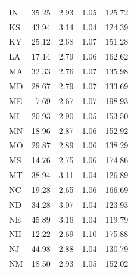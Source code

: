 \documentclass[Afour,sageh,times]{sagej}
\begin{document}
\begin{table}
\begin{tabular}{ l r r r r }
	IN    & 35.25                       & 2.93                 & 1.05         & 125.72                    \\
	KS    & 43.94                       & 3.14                 & 1.04         & 124.39                    \\
	KY    & 25.12                       & 2.68                 & 1.07         & 151.28                    \\
	LA    & 17.14                       & 2.79                 & 1.06         & 162.62                    \\
	MA    & 32.33                       & 2.76                 & 1.07         & 135.98                    \\
	MD    & 28.67                       & 2.79                 & 1.07         & 133.69                    \\
	ME    &  7.69                       & 2.67                 & 1.07         & 198.93                    \\
	MI    & 20.93                       & 2.90                 & 1.05         & 153.50                    \\
	MN    & 18.96                       & 2.87                 & 1.06         & 152.92                    \\
	MO    & 29.87                       & 2.89                 & 1.06         & 138.29                    \\
	MS    & 14.76                       & 2.75                 & 1.06         & 174.86                    \\
	MT    & 38.94                       & 3.11                 & 1.04         & 126.89                    \\
	NC    & 19.28                       & 2.65                 & 1.06         & 166.69                    \\
	ND    & 34.28                       & 3.07                 & 1.04         & 123.93                    \\
	NE    & 45.89                       & 3.16                 & 1.04         & 119.79                    \\
	NH    & 12.22                       & 2.69                 & 1.10         & 175.88                    \\
	NJ    & 44.98                       & 2.88                 & 1.04         & 130.79                    \\
	NM    & 18.50                       & 2.93                 & 1.05         & 152.02                    \\

\end{tabular}
\end{table}
\end{document}
